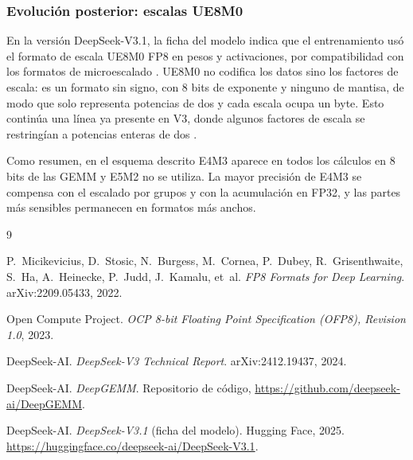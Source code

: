 \documentclass{article}
\begin{document}
      \subsubsection{Evolución posterior: escalas UE8M0}

        En la versión DeepSeek-V3.1, la ficha del modelo indica que el
        entrenamiento usó el formato de escala UE8M0 FP8 en pesos y
        activaciones, por compatibilidad con los formatos de microescalado
        \cite{deepseek2025v31}. UE8M0 no codifica los datos sino los
        factores de escala: es un formato sin signo, con 8 bits de
        exponente y ninguno de mantisa, de modo que solo representa
        potencias de dos y cada escala ocupa un byte. Esto continúa una
        línea ya presente en V3, donde algunos factores de escala se
        restringían a potencias enteras de dos \cite{deepseek2024v3}.


      Como resumen, en el esquema descrito E4M3 aparece en todos los
      cálculos en 8 bits de las GEMM y E5M2 no se utiliza. La mayor
      precisión de E4M3 se compensa con el escalado por grupos y con la
      acumulación en FP32, y las partes más sensibles permanecen en
      formatos más anchos.

  \begin{thebibliography}{9}

      P.~Micikevicius, D.~Stosic, N.~Burgess, M.~Cornea, P.~Dubey,
      R.~Grisenthwaite, S.~Ha, A.~Heinecke, P.~Judd, J.~Kamalu, et~al.
      \emph{FP8 Formats for Deep Learning}. arXiv:2209.05433, 2022.

      Open Compute Project.
      \emph{OCP 8-bit Floating Point Specification (OFP8), Revision 1.0}, 2023.

      DeepSeek-AI.
      \emph{DeepSeek-V3 Technical Report}. arXiv:2412.19437, 2024.

      DeepSeek-AI.
      \emph{DeepGEMM}. Repositorio de código,
      \url{https://github.com/deepseek-ai/DeepGEMM}.

      DeepSeek-AI.
      \emph{DeepSeek-V3.1} (ficha del modelo). Hugging Face, 2025.
      \url{https://huggingface.co/deepseek-ai/DeepSeek-V3.1}.

  \end{thebibliography}
\end{document}
